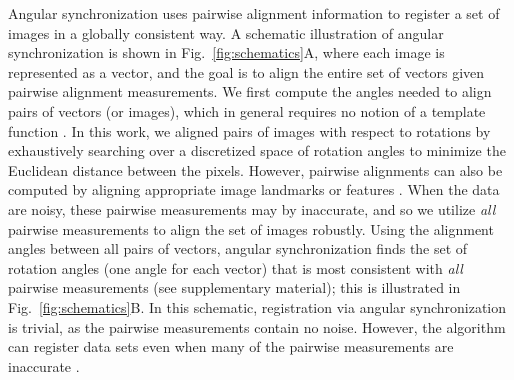 \documentclass[twocolumn, 10pt]{article}
\newcommand{\SI}[0]{supplementary material}
\newcommand{\fig}[0]{Fig.}
\begin{document}
Angular synchronization uses pairwise alignment information to register a set of images in a globally consistent way.
%
A schematic illustration of angular synchronization is shown in \fig~\ref{fig:schematics}A, where each image is represented as a vector, and the goal is to align the entire set of vectors given pairwise alignment measurements.
%
We first compute the angles needed to align pairs of vectors (or images), which in general requires no notion of a template function \citep{ahuja2007template, sonday2013noisy}.
%
In this work, we aligned pairs of images with respect to rotations by exhaustively searching over a discretized space of rotation angles to minimize the Euclidean distance between the pixels.
%
However, pairwise alignments can also be computed by aligning appropriate image landmarks or features \citep{ian1998statistical}.
%
When the data are noisy, these pairwise measurements may by inaccurate, and so we utilize {\em all} pairwise measurements to align the set of images robustly.
%
Using the alignment angles between all pairs of vectors, angular synchronization finds the set of rotation angles (one angle for each vector) that is most consistent with {\it all} pairwise measurements (see \SI); this is illustrated in \fig~\ref{fig:schematics}B.
%
In this schematic, registration via angular synchronization is trivial, as the pairwise measurements contain no noise.
%
However, the algorithm can register data sets even when many of the pairwise measurements are inaccurate \citep{singer2011angular}.
\end{document}

